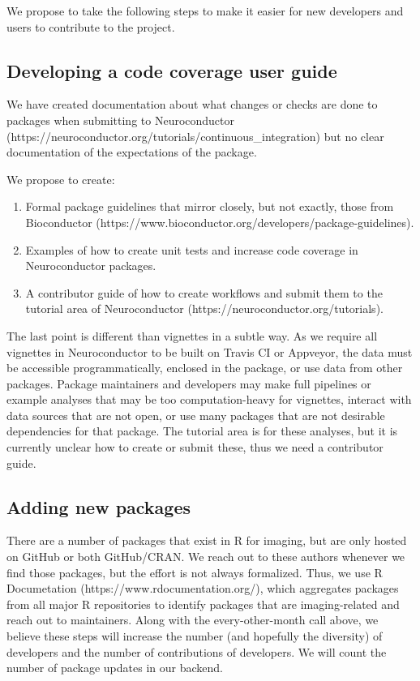 \documentclass[]{elsarticle} %
\providecommand{\tightlist}{%
  \setlength{\itemsep}{0pt}\setlength{\parskip}{0pt}}
\begin{document}
We propose to take the following steps to make it easier for new developers and users to contribute to the project.

\hypertarget{developing-a-code-coverage-user-guide}{%
\subsection{Developing a code coverage user guide}\label{developing-a-code-coverage-user-guide}}

We have created documentation about what changes or checks are done to packages when submitting to Neuroconductor (https://neuroconductor.org/tutorials/continuous\_integration) but no clear documentation of the expectations of the package.

We propose to create:

\begin{enumerate}
\def\labelenumi{\arabic{enumi}.}
\tightlist
\item
  Formal package guidelines that mirror closely, but not exactly, those from Bioconductor (https://www.bioconductor.org/developers/package-guidelines).
\item
  Examples of how to create unit tests and increase code coverage in Neuroconductor packages.
\item
  A contributor guide of how to create workflows and submit them to the tutorial area of Neuroconductor (https://neuroconductor.org/tutorials).
\end{enumerate}

The last point is different than vignettes in a subtle way. As we require all vignettes in Neuroconductor to be built on Travis CI or Appveyor, the data must be accessible programmatically, enclosed in the package, or use data from other packages. Package maintainers and developers may make full pipelines or example analyses that may be too computation-heavy for vignettes, interact with data sources that are not open, or use many packages that are not desirable dependencies for that package. The tutorial area is for these analyses, but it is currently unclear how to create or submit these, thus we need a contributor guide.

\hypertarget{adding-new-packages}{%
\subsection{Adding new packages}\label{adding-new-packages}}

There are a number of packages that exist in R for imaging, but are only hosted on GitHub or both GitHub/CRAN. We reach out to these authors whenever we find those packages, but the effort is not always formalized. Thus, we use R Documetation (https://www.rdocumentation.org/), which aggregates packages from all major R repositories to identify packages that are imaging-related and reach out to maintainers. Along with the every-other-month call above, we believe these steps will increase the number (and hopefully the diversity) of developers and the number of contributions of developers. We will count the number of package updates in our backend.
\end{document}
